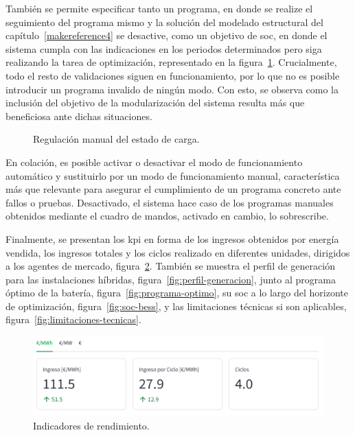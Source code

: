 También se permite especificar tanto un programa, en donde se realize el seguimiento del programa mismo y la solución del modelado estructural del capítulo~\ref{makereference4} se desactive, como un objetivo de \gls{soc}, en donde el sistema cumpla con las indicaciones en los periodos determinados pero siga realizando la tarea de optimización, representado en la figura~\ref{fig:soc-manual}. Crucialmente, todo el resto de validaciones siguen en funcionamiento, por lo que no es posible introducir un programa invalido de ningún modo. Con esto, se observa como la inclusión del objetivo de la modularización del sistema resulta más que beneficiosa ante dichas situaciones.

\begin{figure}
  \centering
  \caption{Regulación manual del estado de carga.}
  \label{fig:soc-manual}
\end{figure}

En colación, es posible activar o desactivar el modo de funcionamiento automático y sustituirlo por un modo de funcionamiento manual, característica más que relevante para asegurar el cumplimiento de un programa concreto ante fallos o pruebas. Desactivado, el sistema hace caso de los programas manuales obtenidos mediante el cuadro de mandos, activado en cambio, lo sobrescribe.

Finalmente, se presentan los \gls{kpi} en forma de los ingresos obtenidos por energía vendida, los ingresos totales y los ciclos realizado en diferentes unidades, dirigidos a los agentes de mercado, figura~\ref{fig:kpi-sistema}. También se muestra el perfil de generación para las instalaciones híbridas, figura~\ref{fig:perfil-generacion}, junto al programa óptimo de la batería, figura~\ref{fig:programa-optimo}, su \gls{soc} a lo largo del horizonte de optimización, figura~\ref{fig:soc-bess}, y las limitaciones técnicas si son aplicables, figura~\ref{fig:limitaciones-tecnicas}.

\begin{figure}
  \centering
  \includegraphics[width=0.75\linewidth]{figures/kpi-sistema.png}
  \caption{Indicadores de rendimiento.}
  \label{fig:kpi-sistema}
\end{figure}


